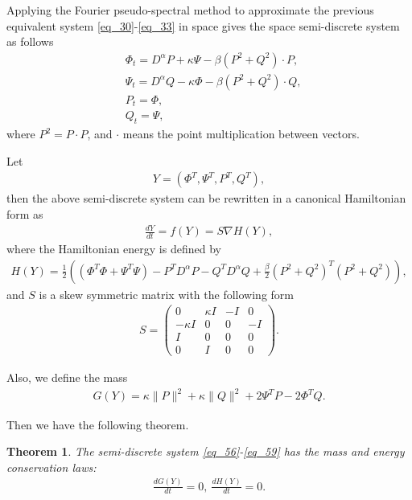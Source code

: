 \documentclass[preprint,compress,3p,10pt,fleqn]{elsarticle}
\numberwithin{equation}{section}
\newtheorem{theorem}{Theorem}[section]
\begin{document}
Applying the Fourier pseudo-spectral method to approximate the previous equivalent system \eqref{eq_30}-\eqref{eq_33} in space gives the space semi-discrete system as follows
\begin{align}
&\varPhi_{t}=D^{\alpha}P+\kappa \Psi-\beta \left( P^{2}+Q^{2}\right)\cdot P,\label{eq_56}\\
&\Psi_{t}=D^{\alpha}Q-\kappa \varPhi-\beta \left( P^{2}+Q^{2}\right)\cdot Q,\label{eq_57}\\
&P_t=\varPhi,\label{eq_58}\\
&Q_t=\Psi,\label{eq_59}
\end{align}
where $P^{2}=P \cdot P$, and $\cdot$ means the point multiplication between vectors.

Let
\begin{align}\label{eq_60a}
Y=\left(\varPhi^{T}, \Psi^{T}, P^{T}, Q^{T}\right),
\end{align}
then the above semi-discrete system can be rewritten in a canonical Hamiltonian form as
\begin{align}\label{eq_60}
\frac{d Y}{d t}=f(Y)=S \nabla H(Y),
\end{align}
where the Hamiltonian energy is defined by
\begin{align}\label{eq_61}
	H(Y)=\frac{1}{2}\left((\varPhi^{T}\varPhi+\Psi^{T}\Psi)-P^{T} D^{\alpha} P-Q^{T} D^{\alpha} Q+\frac{\beta}{2}(P^2+Q^2)^{T}(P^2+Q^2)\right),
\end{align}
and $S$ is a skew symmetric matrix with the following form
\begin{align}\label{eq_62}
S=\left(\begin{array}{cccc}
0 & \kappa I & -I & 0 \\
-\kappa I & 0 & 0 & -I \\
I & 0 & 0 & 0 \\
0 & I & 0 & 0
\end{array}\right).
\end{align}

Also, we define the mass
\begin{align}\label{eq_63}
G(Y)=\kappa\|P\|^{2}+\kappa\|Q\|^{2} +2\Psi^{T}P-2\varPhi^{T}Q.
\end{align}

Then we have the following theorem.
\begin{theorem}	\label{thm3}
	The semi-discrete system \eqref{eq_56}-\eqref{eq_59} has the mass and energy conservation laws:
\begin{align}
\frac{d G(Y)}{d t}=0,~\frac{d H(Y)}{d t}=0.
\end{align}
\end{theorem}
\end{document}
